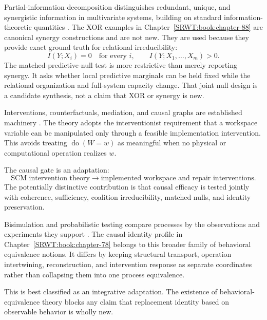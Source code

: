 
Partial-information decomposition distinguishes redundant, unique, and
synergistic information in multivariate systems, building on standard
information-theoretic quantities \cite{SRWT:CoverThomas2006,SRWT:WilliamsBeer2010}. The
XOR examples in Chapter~\ref{SRWT:book:chapter-88} are canonical synergy constructions and are not new.
They are used because they provide exact ground truth for relational
irreducibility:
\[
I(Y;X_i)=0
\quad\text{for every }i,
\qquad
I(Y;X_1,\ldots,X_m)>0.
\]
The matched-predictive-null test is more restrictive than merely
reporting synergy. It asks whether local predictive marginals can be held
fixed while the relational organization and full-system capacity change.
That joint null design is a candidate synthesis, not a claim that XOR or
synergy is new.


Interventions, counterfactuals, mediation, and causal graphs are established
machinery \cite{SRWT:Pearl2009}. The theory adopts the interventionist
requirement that a workspace variable can be manipulated only through a
feasible implementation intervention. This avoids treating
\(\operatorname{do}(W=w)\) as meaningful when no physical or computational
operation realizes \(w\).

The causal gate is an adaptation:
\[
\text{SCM intervention theory}
\longrightarrow
\text{implemented workspace and repair interventions}.
\]
The potentially distinctive contribution is that causal efficacy is tested
jointly with coherence, sufficiency, coalition irreducibility, matched nulls,
and identity preservation.


Bisimulation and probabilistic testing compare processes by the observations
and experiments they support \cite{SRWT:LarsenSkou1991}. The causal-identity profile
in Chapter~\ref{SRWT:book:chapter-78} belongs to this broader family of behavioral equivalence notions.
It differs by keeping structural transport, operation intertwining,
reconstruction, and intervention response as separate coordinates rather than
collapsing them into one process equivalence.

This is best classified as an integrative adaptation. The existence of
behavioral-equivalence theory blocks any claim that replacement identity based
on observable behavior is wholly new.

